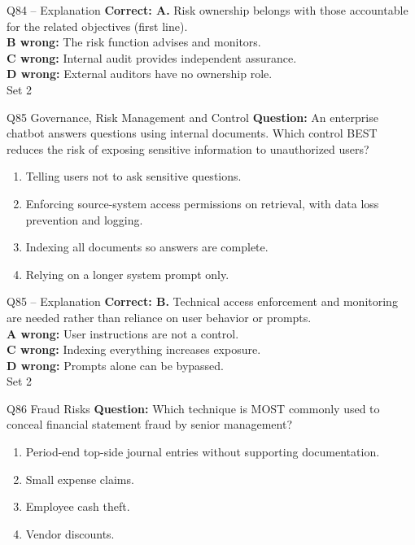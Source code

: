 \documentclass[aspectratio=169,10pt]{beamer}
\begin{document}
\begin{frame}[t]{Q84 -- Explanation}
	\footnotesize
	\textbf{Correct: A.} Risk ownership belongs with those accountable for the related objectives (first line). \\[5pt]
\textbf{B wrong:} The risk function advises and monitors. \\[3pt]
\textbf{C wrong:} Internal audit provides independent assurance. \\[3pt]
\textbf{D wrong:} External auditors have no ownership role. \\[3pt]
	\vfill {\tiny Set 2}
\end{frame}

\begin{frame}[t]{Q85 \hfill {\scriptsize Governance, Risk Management and Control}}
	\small
	\textbf{Question:} An enterprise chatbot answers questions using internal documents. Which control BEST reduces the risk of exposing sensitive information to unauthorized users?
	\begin{enumerate}[label=\Alph*.,itemsep=1pt,topsep=3pt]
			\item Telling users not to ask sensitive questions.
			\item Enforcing source-system access permissions on retrieval, with data loss prevention and logging.
			\item Indexing all documents so answers are complete.
			\item Relying on a longer system prompt only.
	\end{enumerate}
\end{frame}

\begin{frame}[t]{Q85 -- Explanation}
	\footnotesize
	\textbf{Correct: B.} Technical access enforcement and monitoring are needed rather than reliance on user behavior or prompts. \\[5pt]
\textbf{A wrong:} User instructions are not a control. \\[3pt]
\textbf{C wrong:} Indexing everything increases exposure. \\[3pt]
\textbf{D wrong:} Prompts alone can be bypassed. \\[3pt]
	\vfill {\tiny Set 2}
\end{frame}

\begin{frame}[t]{Q86 \hfill {\scriptsize Fraud Risks}}
	\small
	\textbf{Question:} Which technique is MOST commonly used to conceal financial statement fraud by senior management?
	\begin{enumerate}[label=\Alph*.,itemsep=1pt,topsep=3pt]
			\item Period-end top-side journal entries without supporting documentation.
			\item Small expense claims.
			\item Employee cash theft.
			\item Vendor discounts.
	\end{enumerate}
\end{frame}
\end{document}
